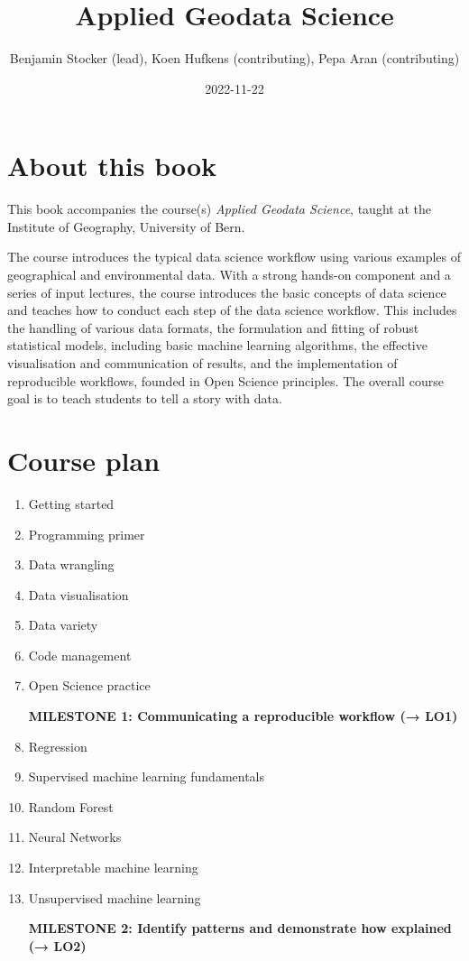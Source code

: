 \documentclass[
]{book}
\title{Applied Geodata Science}
\author{Benjamin Stocker (lead), Koen Hufkens (contributing), Pepa Aran (contributing)}
\date{2022-11-22}
\begin{document}
\maketitle

{
\setcounter{tocdepth}{1}
\tableofcontents
}
\hypertarget{about-this-book}{%
\chapter*{About this book}\label{about-this-book}}

This book accompanies the course(s) \emph{Applied Geodata Science}, taught at the Institute of Geography, University of Bern.

The course introduces the typical data science workflow using various examples of geographical and environmental data. With a strong hands-on component and a series of input lectures, the course introduces the basic concepts of data science and teaches how to conduct each step of the data science workflow. This includes the handling of various data formats, the formulation and fitting of robust statistical models, including basic machine learning algorithms, the effective visualisation and communication of results, and the implementation of reproducible workflows, founded in Open Science principles. The overall course goal is to teach students to tell a story with data.

\hypertarget{course-plan}{%
\chapter*{Course plan}\label{course-plan}}

\begin{enumerate}
\def\labelenumi{\arabic{enumi}.}
\item
  Getting started
\item
  Programming primer
\item
  Data wrangling
\item
  Data visualisation
\item
  Data variety
\item
  Code management
\item
  Open Science practice

  \textbf{MILESTONE 1: Communicating a reproducible workflow (→ LO1)}
\item
  Regression
\item
  Supervised machine learning fundamentals
\item
  Random Forest
\item
  Neural Networks
\item
  Interpretable machine learning
\item
  Unsupervised machine learning

  \textbf{MILESTONE 2: Identify patterns and demonstrate how explained (→ LO2)}
\end{enumerate}
\end{document}
